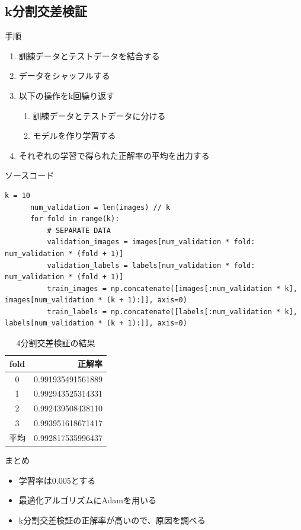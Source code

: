 \documentclass[dvipdfmx]{beamer}
\begin{document}
  \begin{frame}
    \section{k分割交差検証}
  \end{frame}

  \begin{frame}{手順}
    \begin{enumerate}
      \item 訓練データとテストデータを結合する
      \item データをシャッフルする
      \item 以下の操作をk回繰り返す
      \begin{enumerate}
        \item 訓練データとテストデータに分ける
        \item モデルを作り学習する
      \end{enumerate}
      \item それぞれの学習で得られた正解率の平均を出力する
    \end{enumerate}
  \end{frame}

  \begin{frame}[fragile]{ソースコード}
    \begin{lstlisting}[caption=ksparate\_train.py]
      k = 10
      num_validation = len(images) // k
      for fold in range(k):
          # SEPARATE DATA
          validation_images = images[num_validation * fold: num_validation * (fold + 1)]
          validation_labels = labels[num_validation * fold: num_validation * (fold + 1)]
          train_images = np.concatenate([images[:num_validation * k], images[num_validation * (k + 1):]], axis=0)
          train_labels = np.concatenate([labels[:num_validation * k], labels[num_validation * (k + 1):]], axis=0)
      \end{lstlisting}
  \end{frame}

  \begin{frame}
    \begin{table}[H]
      \centering
      \caption{4分割交差検証の結果}
      \begin{tabular}{cr}
        \hline
        fold & 正解率 \\
        \hline \hline
        0 & 0.991935491561889 \\
        1 & 0.992943525314331 \\
        2 & 0.992439508438110 \\
        3 & 0.993951618671417 \\
        \hline \hline
        平均 & 0.992817535996437 \\
        \hline
      \end{tabular}
    \end{table}
  \end{frame}

  \begin{frame}{まとめ}
    \begin{itemize}
      \item 学習率は0.005とする
      \item 最適化アルゴリズムにAdamを用いる
      \item k分割交差検証の正解率が高いので、原因を調べる
    \end{itemize}
  \end{frame}
\end{document}
